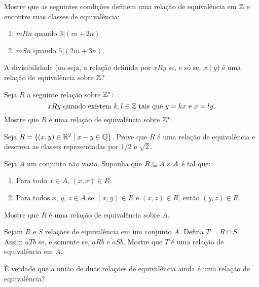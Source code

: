 \documentclass[12pt]{exam}
\begin{document}
    \vspace{.3cm}

    \questao{} Mostre que as seguintes condições definem uma relação de equivalência em $\mathbb{Z}$ e encontre suas classes de equivalência:
    \begin{enumerate}[label={\alph*})]
        \item $mRn$ quando $3 | (m + 2n)$

        \item $mSn$ quando $5 | (2m + 3n)$.
    \end{enumerate}

    \vspace{.3cm}

    \questao{} A divisibilidade (ou seja, a rela{\c c}{\~a}o definida por $xRy$ se, e s{\'o}
    se, $x \mid y$) {\'e} uma rela{\c c}{\~a}o de equival{\^e}ncia sobre $\mathbb{Z}$?

    \vspace{.3cm}

    \questao{} Seja $R$ a seguinte rela{\c c}{\~a}o sobre $\mathbb{Z}^*$:
    \[
        x R y \mbox{ quando existem }  k, l \in \mathbb{Z} \mbox{ tais que } y = kx \mbox{ e } x = ly.
    \]
    Mostre que $R$ {\'e} uma rela{\c c}{\~a}o de equival{\^e}ncia sobre $\mathbb{Z}^*$.

    \vspace{.3cm}

    \questao{} Seja $R = \{ (x, y) \in \mathbb{R}^2 \mid x - y \in \mathbb{Q}\}$. Prove que $R$ {\'e} uma rela{\c c}{\~a}o de equival{\^e}ncia e descreva as classes representadas por $1/2$ e $\sqrt{2}$.

    \vspace{.3cm}

    \questao{} Seja $A$ um conjunto n\~ao vazio. Suponha que $R \subseteq A \times A$ \'e tal que:
    \begin{enumerate}[label={\alph*})]
        \item Para todo $x \in A$, $(x,x) \in R$;

        \item Para todos $x$, $y$, $z \in A$ se $(x, y) \in R$ e $(x,z) \in R$, ent\~ao $(y,z) \in R$.
    \end{enumerate}
    Mostre que $R$ \'e uma rela\c{c}\~ao de equival\^encia sobre $A$.

    \vspace{.3cm}

    \questao{} Sejam $R$ e $S$ relações de equivalência em um conjunto $A$. Defina $T = R \cap S$. Assim $aTb$ se, e somente se, $aRb$ e $aSb$. Mostre que $T$ é uma relação de equivalência em $A$.

    \vspace{.3cm}

    \questao{} É verdade que a união de duas relações de equivalência ainda é uma relação de equivalência?
\end{document}
